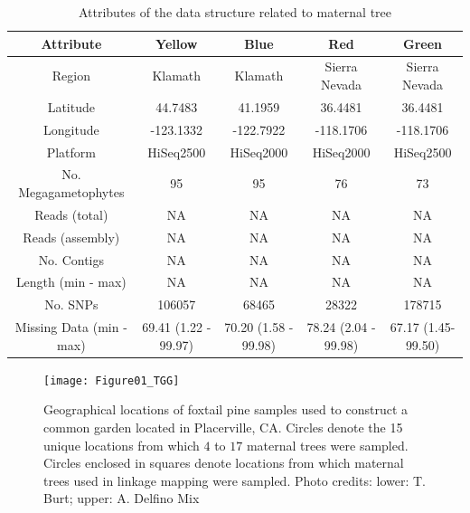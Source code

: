 \documentclass[11pt]{article}
\begin{document}
\clearpage
\begin{landscape}

\begin{table}[ht]
\centering
\begin{tabular}{ccccc}
\toprule
Attribute & Yellow & Blue & Red & Green\\
\midrule
Region & Klamath & Klamath & Sierra Nevada & Sierra Nevada \\
Latitude & 44.7483 & 41.1959 & 36.4481 & 36.4481 \\
Longitude & -123.1332 & -122.7922 & -118.1706 & -118.1706 \\
Platform & HiSeq2500 & HiSeq2000 & HiSeq2000 & HiSeq2500 \\
No. Megagametophytes & 95 & 95 & 76 & 73 \\
Reads (total) & NA & NA & NA & NA \\
Reads (assembly) & NA & NA & NA & NA \\
No. Contigs & NA & NA & NA & NA \\
Length (min - max) & NA & NA & NA & NA \\
No. SNPs & 106057 & 68465 & 28322 & 178715 \\
Missing Data (min - max) & 69.41 (1.22 - 99.97) & 70.20 (1.58 - 99.98) & 78.24 (2.04 - 99.98) & 67.17 (1.45-99.50) \\
\bottomrule
\end{tabular}
\caption{Attributes of the data structure related to maternal tree} 
\label{t:label}
\end{table}
\end{landscape}

\clearpage

\begin{figure}[ht]
\centering
\texttt{[image: Figure01\_TGG]}
\caption{Geographical locations of foxtail pine samples used to construct a common garden located in Placerville, CA. Circles 
denote the 15 unique locations from which $4$ to $17$ maternal trees were sampled. Circles enclosed in squares denote 
locations from which maternal trees used in linkage mapping were sampled. Photo credits: lower: T. Burt; upper: A. Delfino Mix}
\label{f:Figure01_TGG}
\end{figure}
\end{document}

